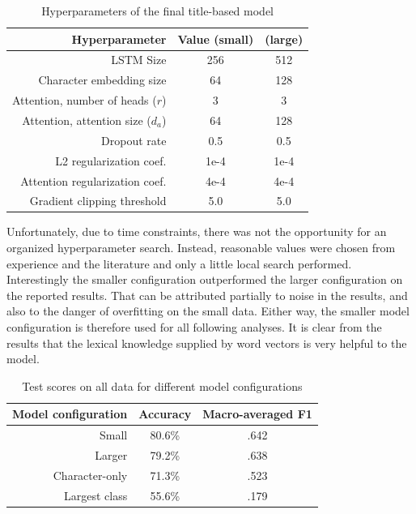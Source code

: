 \documentclass[letterpaper]{article} %
\begin{document}
\begin{table}
  \centering
  \caption{Hyperparameters of the final title-based model}
  \begin{tabular}{r | c | c}
    Hyperparameter & Value (small) & (large) \\
    \hline
    LSTM Size & 256 & 512 \\
    Character embedding size & 64 & 128 \\
    Attention, number of heads ($r$) & 3 & 3\\
    Attention, attention size ($d_a$) & 64 & 128\\
    Dropout rate & 0.5 & 0.5 \\
    L2 regularization coef. & 1e-4 & 1e-4 \\
    Attention regularization coef. & 4e-4 & 4e-4 \\
    Gradient clipping threshold & 5.0 & 5.0 \\
  \end{tabular}
\end{table}

Unfortunately,
due to time constraints,
there was not the opportunity for an organized hyperparameter search.
Instead,
reasonable values were chosen from experience and the literature
and only a little local search performed.
Interestingly the smaller configuration outperformed the larger configuration
on the reported results.
That can be attributed partially to noise in the results,
and also to the danger of overfitting on the small data.
Either way,
the smaller model configuration is therefore used for all following analyses.
It is clear from the results that the lexical knowledge supplied by word vectors
is very helpful to the model.

\begin{table}
  \centering
  \caption{Test scores on all data for different model configurations}
  \begin{tabular}{r | c | c}
    Model configuration & Accuracy & Macro-averaged F1 \\
    \hline
    Small & 80.6\% &  .642 \\
    Larger & 79.2\% & .638 \\
    Character-only & 71.3\% & .523 \\
    Largest class & 55.6\% & .179 \\
  \end{tabular}
\end{table}
\end{document}
